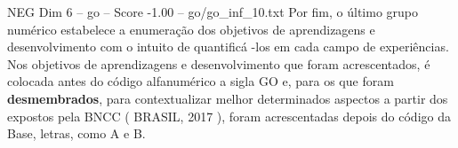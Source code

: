 \begin{textsample}{NEG Dim 6 – go – Score -1.00 – go/go\_inf\_10.txt}
Por fim, o último grupo numérico estabelece a enumeração dos objetivos de aprendizagens e desenvolvimento com o intuito de quantificá -los em cada campo de experiências.
Nos objetivos de aprendizagens e desenvolvimento que foram acrescentados, é colocada antes do código alfanumérico a sigla GO e, para os que foram \textbf{desmembrados}, para contextualizar melhor determinados aspectos a partir dos expostos pela BNCC ( BRASIL, 2017 ), foram acrescentadas depois do código da Base, letras, como A e B.

\end{textsample}
